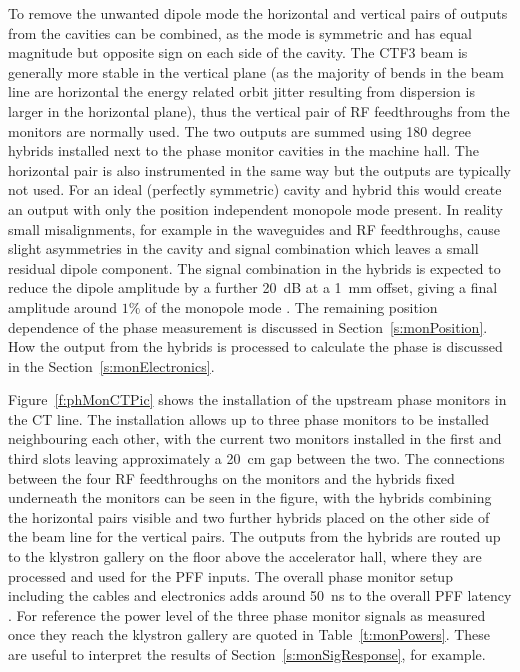To remove the unwanted dipole mode the horizontal and vertical pairs of outputs from the cavities can be combined, as the mode is symmetric and has equal magnitude but opposite sign on each side of the cavity. The CTF3 beam is generally more stable in the vertical plane (as the majority of bends in the beam line are horizontal the energy related orbit jitter resulting from dispersion is larger in the horizontal plane), thus the vertical pair of RF feedthroughs from the monitors are normally used. The two outputs are summed using 180 degree hybrids \cite{alexCWS13} installed next to the phase monitor cavities in the machine hall. The horizontal pair is also instrumented in the same way but the outputs are typically not used. For an ideal (perfectly symmetric) cavity and hybrid this would create an output with only the position independent monopole mode present. In reality small misalignments, for example in the waveguides and RF feedthroughs, cause slight asymmetries in the cavity and signal combination which leaves a small residual dipole component. The signal combination in the hybrids is expected to reduce the dipole amplitude by a further 20~dB at a 1~mm offset, giving a final amplitude around \(1\%\) of the monopole mode \cite{alexCWS13}. The remaining position dependence of the phase measurement is discussed in Section~\ref{s:monPosition}. How the output from the hybrids is processed to calculate the phase is discussed in the Section~\ref{s:monElectronics}.

Figure~\ref{f:phMonCTPic} shows the installation of the upstream phase monitors in the CT line. The installation allows up to three phase monitors to be installed neighbouring each other, with the current two monitors installed in the first and third slots leaving approximately a 20~cm gap between the two. The connections between the four RF feedthroughs on the monitors and the hybrids fixed underneath the monitors can be seen in the figure, with the hybrids combining the horizontal pairs visible and two further hybrids placed on the other side of the beam line for the vertical pairs. The outputs from the hybrids are routed up to the klystron gallery on the floor above the accelerator hall, where they are processed and used for the PFF inputs. The overall phase monitor setup including the cables and electronics adds around 50~ns to the overall PFF latency \cite{alexPriv}. For reference the power level of the three phase monitor signals as measured once they reach the klystron gallery are quoted in Table~\ref{t:monPowers}. These are useful to interpret the results of Section~\ref{s:monSigResponse}, for example. %

